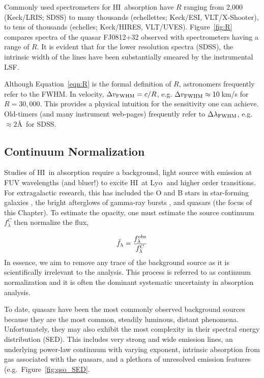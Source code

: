 \documentclass[graybox]{svmult}
\newcommand{\HI}{H{\sc I}}
\def\lya{Ly$\alpha$}
\begin{document}
Commonly used spectrometers for \HI\ absorption have $R$ ranging
from 2,000 (Keck/LRIS; SDSS) to many thousands (echellettes; 
Keck/ESI, VLT/X-Shooter), to tens of thousands
(echelles; Keck/HIRES, VLT/UVES).  Figure~\ref{fig:R}
compares spectra of the quasar FJ0812+32 observed
with spectrometers having a range of $R$.  It is evident
that for the lower resolution spectra (SDSS), the intrinsic
width of the lines have been substantially smeared by the 
instrumental LSF.

Although Equation~\ref{eqn:R} is the formal definition of $R$,
astronomers frequently refer to the FWHM.  In velocity,
$\Delta v_{\rm FWHM} = c/R$, e.g. 
$\Delta v_{\rm FWHM} \approx 10$\,km/s for $R = 30,000$.
This provides a physical intuition for the sensitivity
one can achieve.  Old-timers (and many instrument web-pages)
frequently refer to $\Delta \lambda_{\rm FWHM}$, e.g.\ $\approx 2$\AA\
for SDSS.

\subsection{Continuum Normalization}
Studies of \HI\ in absorption require a background, light source
with emission at FUV wavelengths (and bluer!) to excite \HI\
at \lya\ and higher order transitions.
For extragalactic research, this has included the O and B stars
in star-forming galaxies \cite{lee16}, the bright afterglows
of gamma-ray bursts \cite{fynbo1X}, and quasars (the focus
of this Chapter).   To estimate the opacity, one must estimate
the source continuum $f^C_\lambda$ then normalize the flux, 

\begin{equation}
\bar f_\lambda = \frac{f_\lambda^{\rm obs}}{f_\lambda^C}
\end{equation}
In essence, we aim to remove any trace of the background
source as it is scientifically irrelevant to the analysis.
This process is referred to as continuum normalization and
it is often the dominant systematic uncertainty in absorption
analysis.

To date, quasars have been the most commonly observed background
sources because they are the most common, steadily luminous, distant
phenomena.   Unfortunately, they may also exhibit the most complexity
in their spectral energy distribution (SED).  This includes
very strong and wide emission lines, an underlying power-law
continuum with varying exponent, intrinsic absorption from gas
associated with the quasars, and a plethora of unresolved emission
features (e.g.\ Figure~\ref{fig:qso_SED}.
\end{document}
